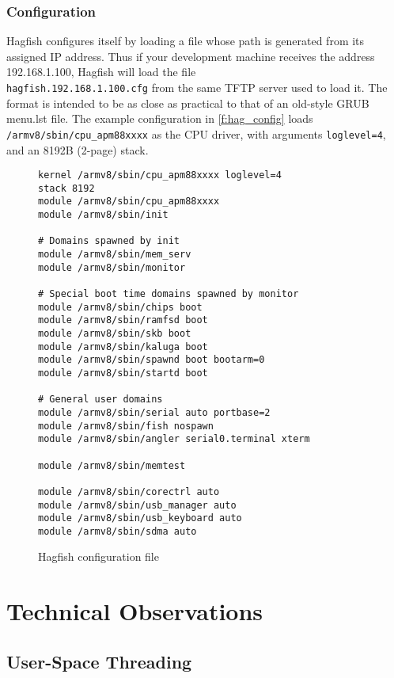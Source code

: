\documentclass[a4paper,twoside]{report}
\begin{document}
\subsection{Configuration}

Hagfish configures itself by loading a file whose path is generated from its
assigned IP address. Thus if your development machine receives the address
192.168.1.100, Hagfish will load the file\\
\texttt{hagfish.192.168.1.100.cfg}
from the same TFTP server used to load it. The format is intended to be as
close as practical to that of an old-style GRUB menu.lst file. The example
configuration in \autoref{f:hag_config} loads
\texttt{/armv8/sbin/cpu\_apm88xxxx} as the CPU driver, with arguments
\texttt{loglevel=4}, and an 8192B (2-page) stack.

\begin{figure}[htb]
\begin{center}
\begin{lstlisting}
kernel /armv8/sbin/cpu_apm88xxxx loglevel=4
stack 8192
module /armv8/sbin/cpu_apm88xxxx
module /armv8/sbin/init

# Domains spawned by init
module /armv8/sbin/mem_serv
module /armv8/sbin/monitor

# Special boot time domains spawned by monitor
module /armv8/sbin/chips boot
module /armv8/sbin/ramfsd boot
module /armv8/sbin/skb boot
module /armv8/sbin/kaluga boot
module /armv8/sbin/spawnd boot bootarm=0
module /armv8/sbin/startd boot

# General user domains
module /armv8/sbin/serial auto portbase=2
module /armv8/sbin/fish nospawn
module /armv8/sbin/angler serial0.terminal xterm

module /armv8/sbin/memtest

module /armv8/sbin/corectrl auto
module /armv8/sbin/usb_manager auto
module /armv8/sbin/usb_keyboard auto
module /armv8/sbin/sdma auto
\end{lstlisting}
\end{center}
\caption{Hagfish configuration file}
\label{f:hag_config}
\end{figure}

\chapter{Technical Observations}\label{c:tech}

\section{User-Space Threading}\label{s:threads}
\end{document}
